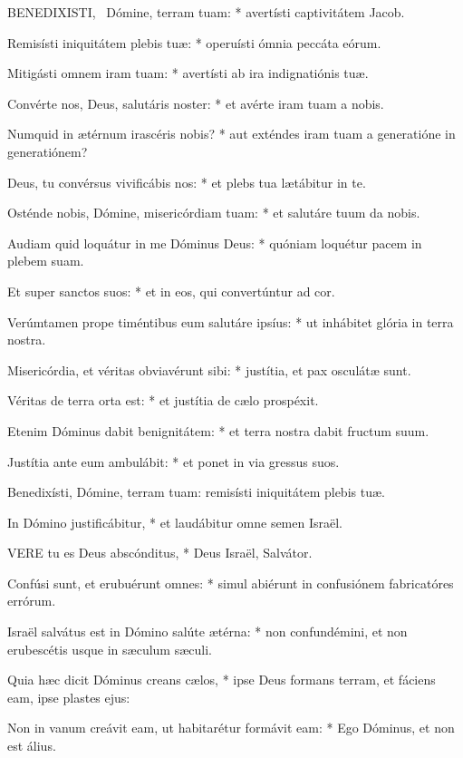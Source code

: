 
\lettrine[lines=2]{B}{ENEDIXISTI}, \textdagger\ Dómine, terram tuam: * avertísti captivitátem Jacob.

Remisísti iniquitátem plebis tuæ: * operuísti ómnia peccáta eórum.

Mitigásti omnem iram tuam: * avertísti ab ira indignatiónis tuæ.

Convérte nos, Deus, salutáris noster: * et avérte iram tuam a nobis.

Numquid in ætérnum irascéris nobis? * aut exténdes iram tuam a generatióne in generatiónem?

Deus, tu convérsus vivificábis nos: * et plebs tua lætábitur in te.

Osténde nobis, Dómine, misericórdiam tuam: * et salutáre tuum da nobis.

Audiam quid loquátur in me Dóminus Deus: * quóniam loquétur pacem in plebem suam.

Et super sanctos suos: * et in eos, qui convertúntur ad cor.

Verúmtamen prope timéntibus eum salutáre ipsíus: * ut inhábitet glória in terra nostra.

Misericórdia, et véritas obviavérunt sibi: * justítia, et pax osculátæ sunt.

Véritas de terra orta est: * et justítia de cælo prospéxit.

Etenim Dóminus dabit benignitátem: * et terra nostra dabit fructum suum.

Justítia ante eum ambulábit: * et ponet in via gressus suos.

 Benedixísti, Dómine, terram tuam: remisísti iniquitátem plebis tuæ.

 In Dómino justificábitur, * et laudábitur omne semen Israël.


\lettrine[lines=2]{V}{ERE} tu es Deus abscónditus, * Deus Israël, Salvátor.

Confúsi sunt, et erubuérunt omnes: * simul abiérunt in confusiónem fabricatóres errórum.

Israël salvátus est in Dómino salúte ætérna: * non confundémini, et non erubescétis usque in sæculum sæculi.

Quia hæc dicit Dóminus creans cælos, * ipse Deus formans terram, et fáciens eam, ipse plastes ejus:

Non in vanum creávit eam, ut habitarétur formávit eam: * Ego Dóminus, et non est álius.

